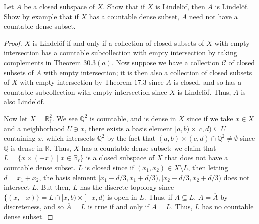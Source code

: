 \documentclass[12pt]{article}
\theoremstyle{remark}
\begin{document}
\begin{problem}
  Let $A$ be a closed subspace of $X$. Show that if $X$ is Lindel\"of, then $A$ is Lindel\"of. Show by example that if $X$ has a countable dense subset, $A$ need not have a countable dense subset.
\end{problem}
\begin{proof}
  $X$ is Lindel\"of if and only if a collection of closed subsets of $X$ with empty intersection has a countable subcollection with empty intersection by taking complements in Theorem $30.3(a)$. Now suppose we have a collection $\mathcal{C}$ of closed subsets of $A$ with empty intersection; it is then also a collection of closed subsets of $X$ with empty intersection by Theorem $17.3$ since $A$ is closed, and so has a countable subcollection with empty intersection since $X$ is Lindel\"of. Thus, $A$ is also Lindel\"of.
  \par Now let $X = \mathbb{R}_\ell^2$. We see $\mathbb{Q}^2$ is countable, and is dense in $X$ since if we take $x \in X$ and a neighborhood $U \ni x$, there exists a basis element $[a,b) \times [c,d) \subseteq U$ containing $x$, which intersects $\mathbb{Q}^2$ by the fact that $(a,b) \times (c,d) \cap \mathbb{Q}^2 \ne \emptyset$ since $\mathbb{Q}$ is dense in $\mathbb{R}$. Thus, $X$ has a countable dense subset; we claim that $L = \{x \times (-x) \mid x \in \mathbb{R}_\ell\}$ is a closed subspace of $X$ that does not have a countable dense subset. $L$ is closed since if $(x_1,x_2) \in X \setminus L$, then letting $d = x_1+x_2$, the basis element $[x_1-d/3,x_1+d/3),[x_2-d/3,x_2+d/3)$ does not intersect $L$. But then, $L$ has the discrete topology since $\{(x,-x)\} = L \cap [x,b) \times [-x,d)$ is open in $L$. Thus, if $A \subseteq L$, $A = \overline{A}$ by discreteness, and so $\overline{A} = L$ is true if and only if $A = L$. Thus, $L$ has no countable dense subset.
\end{proof}
\end{document}
